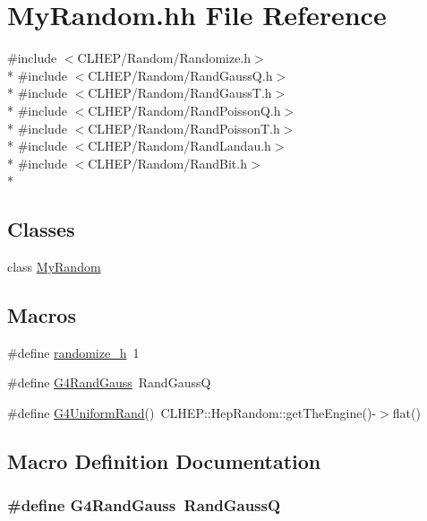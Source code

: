 \hypertarget{_my_random_8hh}{\section{My\-Random.\-hh File Reference}
\label{_my_random_8hh}
}
{\ttfamily \#include $<$C\-L\-H\-E\-P/\-Random/\-Randomize.\-h$>$}\\*
{\ttfamily \#include $<$C\-L\-H\-E\-P/\-Random/\-Rand\-Gauss\-Q.\-h$>$}\\*
{\ttfamily \#include $<$C\-L\-H\-E\-P/\-Random/\-Rand\-Gauss\-T.\-h$>$}\\*
{\ttfamily \#include $<$C\-L\-H\-E\-P/\-Random/\-Rand\-Poisson\-Q.\-h$>$}\\*
{\ttfamily \#include $<$C\-L\-H\-E\-P/\-Random/\-Rand\-Poisson\-T.\-h$>$}\\*
{\ttfamily \#include $<$C\-L\-H\-E\-P/\-Random/\-Rand\-Landau.\-h$>$}\\*
{\ttfamily \#include $<$C\-L\-H\-E\-P/\-Random/\-Rand\-Bit.\-h$>$}\\*
\subsection*{Classes}
\begin{DoxyCompactItemize}
\item 
class \hyperlink{class_my_random}{My\-Random}
\end{DoxyCompactItemize}
\subsection*{Macros}
\begin{DoxyCompactItemize}
\item 
\#define \hyperlink{_my_random_8hh_a1b2012ef5db9d6dfc92420509fd83fb8}{randomize\-\_\-h}~1
\item 
\#define \hyperlink{_my_random_8hh_a4907d9fc84e60e1c93d844b250718478}{G4\-Rand\-Gauss}~Rand\-Gauss\-Q
\item 
\#define \hyperlink{_my_random_8hh_a292914b2bf82aa2222afdd57c39609d1}{G4\-Uniform\-Rand}()~C\-L\-H\-E\-P\-::\-Hep\-Random\-::get\-The\-Engine()-\/$>$flat()
\end{DoxyCompactItemize}


\subsection{Macro Definition Documentation}
\hypertarget{_my_random_8hh_a4907d9fc84e60e1c93d844b250718478}{
\subsubsection[{G4\-Rand\-Gauss}]{\setlength{\rightskip}{0pt plus 5cm}\#define G4\-Rand\-Gauss~Rand\-Gauss\-Q}}\label{_my_random_8hh_a4907d9fc84e60e1c93d844b250718478}


